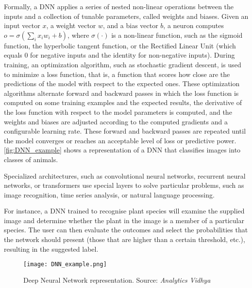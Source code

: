 Formally, a DNN applies a series of nested non-linear operations between the inputs and a collection of tunable parameters, called weights and biases. Given an input vector $x$, a weight vector $w$, and a bias vector $b$, a neuron computes $o=\sigma(\sum_i x_i w_i + b)$, where $\sigma(\cdot)$ is a non-linear function, such as the sigmoid function, the hyperbolic tangent function, or the Rectified Linear Unit (which equals 0 for negative inputs and the identity for non-negative inputs).
During training, an optimization algorithm, such as stochastic gradient descent, is used to minimize a loss function, that is, a function that scores how close are the predictions of the model with respect to the expected ones.
These optimization algorithms alternate forward and backward passes in which the loss function is computed on some training examples and the expected results, the derivative of the loss function with respect to the model parameters is computed, and the weights and biases are adjusted according to the computed gradients and a configurable learning rate. These forward and backward passes are repeated until the model converges or reaches an acceptable level of loss or predictive power. \autoref{fig:DNN_example} shows a representation of a DNN that classifies images into classes of animals.

Specialized architectures, such as convolutional neural networks, recurrent neural networks, or transformers use special layers to solve particular problems, such as image recognition, time series analysis, or natural language processing.


For instance, a DNN trained to recognise plant species will examine the supplied image and determine whether the plant in the image is a member of a particular species. The user can then evaluate the outcomes and select the probabilities that the network should present (those that are higher than a certain threshold, etc.), resulting in the suggested label.
\begin{figure}[h!]
        \centering %
        \texttt{[image: DNN\_example.png]}
        \caption{Deep Neural Network representation. Source: \textit{Analytics Vidhya}} %
        \label{fig:DNN_example}
\end{figure}


